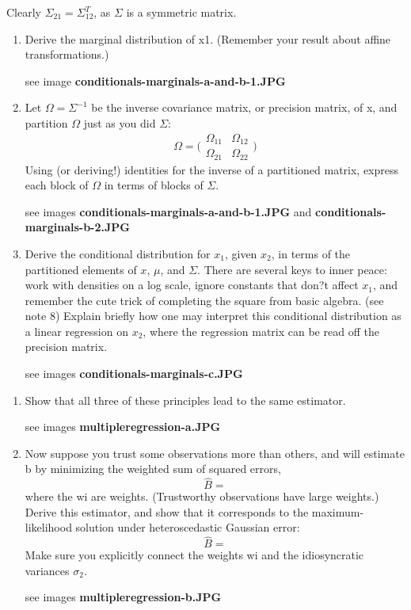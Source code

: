 \documentclass{homework}
\begin{document}
Clearly $\Sigma_{21} = \Sigma_{12}^T$, as $\Sigma$ is a symmetric matrix.
\begin{enumerate}[label=(\Alph*)]
\item Derive the marginal distribution of x1. (Remember your result about affine transformations.)
\par * see image \textbf{conditionals-marginals-a-and-b-1.JPG}

\item Let $\Omega = \Sigma^{-1}$ be the inverse covariance matrix, or precision matrix, of x, and partition $\Omega$ just as you did $\Sigma$:
$$\Omega = \big( \begin{matrix} \Omega_{11} & \Omega_{12} \\ \Omega_{21} & \Omega_{22}\end{matrix} \big)$$
Using (or deriving!) identities for the inverse of a partitioned matrix, express each block of $\Omega$ in terms of blocks of $\Sigma$.
\par * see images \textbf{conditionals-marginals-a-and-b-1.JPG} and \textbf{conditionals-marginals-b-2.JPG}

\item Derive the conditional distribution for $x_1$, given $x_2$, in terms of the partitioned elements of $x$, $\mu$, and $\Sigma$. There are several keys to inner peace: work with densities on a log scale, ignore constants that don?t affect $x_1$, and remember the cute trick of completing the square from basic algebra. (see note 8) Explain briefly how one may interpret this conditional distribution as a linear regression on $x_2$, where the regression matrix can be read off the precision matrix.

\par * see images \textbf{conditionals-marginals-c.JPG} 

\end{enumerate}

\begin{enumerate}[label=(\Alph*)]
\item Show that all three of these principles lead to the same estimator.
\par * see images \textbf{multipleregression-a.JPG} 

\item Now suppose you trust some observations more than others, and will estimate b by minimizing the weighted sum of squared errors,
$$\hat{B} =  $$
where the wi are weights. (Trustworthy observations have large weights.) Derive this estimator, and show that it corresponds to the maximum-likelihood solution under heteroscedastic Gaussian error:
$$\hat{B} =  $$
Make sure you explicitly connect the weights wi and the idiosyncratic variances $\sigma_2$.
\par * see images \textbf{multipleregression-b.JPG} 
\end{enumerate}
\end{document}
